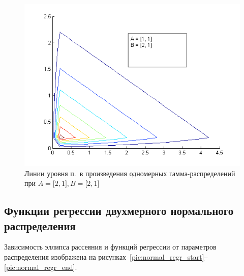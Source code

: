 \begin{figure}[h!]
  \centering
  \includegraphics[width=0.5\linewidth]{pic/gamma_contour_3}
  \caption{Линии уровня п.~в произведения одномерных 
    гамма-распределений при
      $ A = \big[2, 1\big], B = \big[ 2, 1 \big] $}
  \label{pic:gamma_contour_end}
\end{figure}

\newpage

\subsection{Функции регрессии двухмерного
  нормального распределения}

Зависимость эллипса рассеяния и функций регрессии от параметров распределения изображена на рисунках~\ref{pic:normal_regr_start}--\ref{pic:normal_regr_end}.

